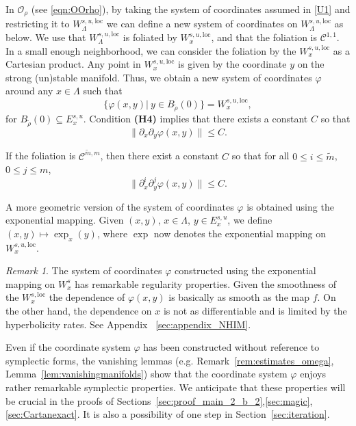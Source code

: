 \documentclass[11pt]{amsart}
\theoremstyle{definition}
\theoremstyle{remark}
\newtheorem{rem}[thm]{Remark}
\numberwithin{equation}{section}
\newcommand{\C}{\mathcal{C}}
\newcommand{\OO}{\mathcal{O}}
\begin{document}
In $\OO_\rho$ (see \eqref{eqn:OOrho}), by taking the  system of coordinates assumed in \eqref{U1} and restricting it  to
  $W^{s,u,\textrm{loc}}_\Lambda $ we can  define a new system of coordinates on $W^{s,u,\textrm{loc}}_\Lambda$ as below.
  We use that $W^{s,u,\textrm{loc}}_\Lambda$ is foliated by $W^{s,u,\textrm{loc}}_x$, and that the foliation is $\C^{1,1}$.
In a small enough neighborhood, we can consider the foliation
by the $W^{s,u,\textrm{loc}}_x$ as a Cartesian product. Any point in $W^{s,u,\textrm{loc}}_x$ is given by the coordinate $y$ on the strong (un)stable manifold.
Thus, we obtain a new system of coordinates $\varphi$  around any $x \in \Lambda$ such   that
\begin{equation}\label{eqn:varphi_x_y}
  \{ \varphi(x, y ) | \  y \in B_{\tilde \rho}(0) \} = W^{s,u,\textrm{loc}}_x,
\end{equation}
for $B_{\tilde \rho}(0)\subseteq E^{s,u}_x$. Condition \textbf{(H4)} implies
that there exists a constant $C$ so that
\begin{equation}\label{eqn:mixed partials reg 1}
     \| \partial_x  \partial_y \varphi(x,y)\| \le C  .
\end{equation}


If the foliation is $\C^{\tilde m,m}$, then
there exist a constant $C$ so that for all $0\le i \le \tilde m$,
    $0 \le j \le m $,
\begin{equation}\label{eqn:mixed partials reg m}
   \| \partial_x^i \partial_y^j \varphi(x,y)\| \le C  .
\end{equation}



A more geometric version of the system of coordinates $\varphi$ is  obtained
using the exponential mapping.
Given $(x, y)$, $x \in \Lambda$, $y \in E^{s,u}_x$,
we define  $(x,y) \mapsto \exp_x(y)$, where
$\exp$ now denotes the exponential mapping on $W^{s,u, \textrm{loc}}_x$.

\begin{rem}
 The system of coordinates $\varphi$ constructed using the exponential mapping on $W^s_x$
 has remarkable regularity properties.
Given the smoothness of  the $W^{s,\textrm{loc}}_x$  the dependence of $\varphi(x,y)$ is
basically as smooth as the map $f$.
On the other hand, the dependence on $x$ is
not as differentiable and is limited by the hyperbolicity rates.
See Appendix ~\ref{sec:appendix_NHIM}.

Even if the coordinate system $\varphi$ has been constructed without reference
to symplectic forms, the vanishing lemmas (e.g.  Remark~\ref{rem:estimates_omega}, Lemma~\ref{lem:vanishingmanifolds})
show that  the coordinate system $\varphi$  enjoys rather remarkable symplectic properties.
We anticipate that these properties will be crucial in the proofs of Sections~\ref{sec:proof_main_2_b_2},\ref{sec:magic}, \ref{sec:Cartanexact}.
It is also a possibility of one step in Section~\ref{sec:iteration}.



\end{rem}
\end{document}
